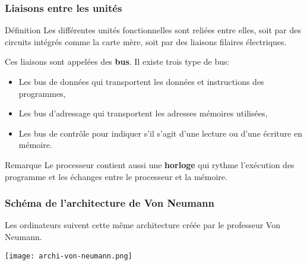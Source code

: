 \documentclass{beamer}
\begin{document}
\begin{frame}
\frametitle{Liaisons entre les unités}
\begin{block}{Définition}
Les différentes unités fonctionnelles sont reliées entre elles, soit par des circuits intégrés comme la carte mère, soit par des liaisons filaires électriques.

Ces liaisons sont appelées des \textbf{bus}. Il existe trois type de bus:
\begin{itemize}
\item Les bus de données qui transportent les données et instructions des programmes,
\item Les bus d'adressage qui transportent les adresses mémoires utilisées,
\item Les bus de contrôle pour indiquer s'il s'agit d'une lecture ou d'une écriture en mémoire.
\end{itemize}
\end{block}

\begin{block}{Remarque}
Le processeur contient aussi une \textbf{horloge} qui rythme l'exécution des programme et les échanges entre le processeur et la mémoire.
\end{block}
\end{frame}

\begin{frame}
\frametitle{Schéma de l'architecture de Von Neumann}
Les ordinateurs suivent cette même architecture créée par le professeur Von Neumann.

\begin{center}
\texttt{[image: archi-von-neumann.png]}
\end{center}
\end{frame}
\end{document}

